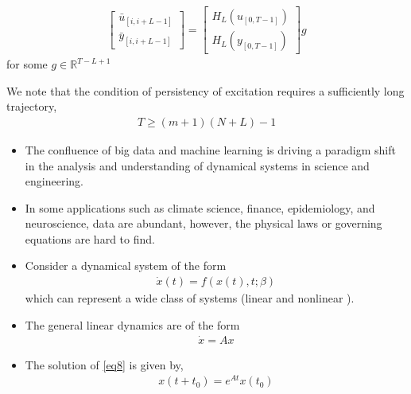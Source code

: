 \documentclass[hyperref={pdfpagemode=FullScreen},aspectratio=169]{beamer}
\begin{document}
\begin{frame}{}
\begin{enumerate}
\begin{align}
\begin{bmatrix}
\bar{u}_{[i,i+L-1]}\\
\bar{y}_{[i,i+L-1]}
\end{bmatrix} = \begin{bmatrix}
H_L(u_{[0,T-1]}) \\
H_L(y_{[0,T-1]})
\end{bmatrix}g
\end{align}
for some $g\in \mathbb{R}^{T-L+1}$
\end{enumerate}
We note that the condition of persistency of excitation requires a sufficiently long trajectory,
\begin{align}
T\geq (m+1)(N+L)-1
\end{align}
\end{frame}
\begin{frame}{}
\begin{itemize}
\setlength\itemsep{1em}
\item The confluence of big data and machine learning is driving a paradigm shift in the analysis and understanding of dynamical systems in science and engineering.
\item In some applications such as climate science, finance, epidemiology, and neuroscience, data are abundant, however, the physical laws or governing equations are hard to find. 
\item Consider a dynamical system of the form 
\begin{align}
\dot{x}(t)=f(x(t),t;\beta)
\end{align}
which can represent a wide class of systems (linear and nonlinear ).
\item The general linear dynamics are of the form
\begin{align}\label{eq8}
\dot{x}=Ax
\end{align}
\item The solution of \cref{eq8} is given by,
\begin{align}
x(t+t_0) = e^{At}x(t_0)
\end{align}
\end{itemize}
\end{frame}
\end{document}

